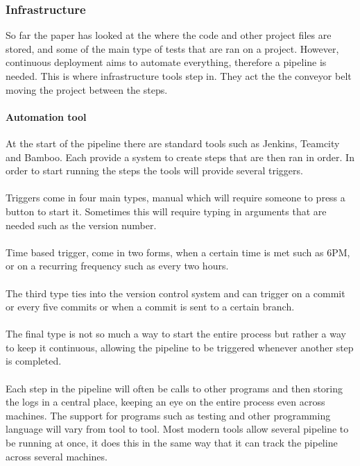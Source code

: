 \subsubsection{Infrastructure}

So far the paper has looked at the where the code and other project files are stored, and some of the main type of tests that are ran on a project. However, continuous deployment aims to automate everything, therefore a pipeline is needed. This is where infrastructure tools step in. They act the the conveyor belt moving the project between the steps.

\paragraph{Automation tool}
At the start of the pipeline there are standard tools such as Jenkins, Teamcity and Bamboo. Each provide a system to create steps that are then ran in order. In order to start running the steps the tools will provide several triggers.
\\\\
Triggers come in four main types, manual which will require someone to press a button to start it. Sometimes this will require typing in arguments that are needed such as the version number. 
\\\\
Time based trigger, come in two forms, when a certain time is met such as 6PM, or on a recurring frequency such as every two hours.
\\\\
The third type ties into the version control system and can trigger on a commit or every five commits or when a commit is sent to a certain branch. 
\\\\
The final type is not so much a way to start the entire process but rather a way to keep it continuous, allowing the pipeline to be triggered whenever another step is completed.
\\\\
Each step in the pipeline will often be calls to other programs and then storing the logs in a central place, keeping an eye on the entire process even across machines. The support for programs such as testing and other programming language will vary from tool to tool. Most modern tools allow several pipeline to be running at once, it does this in the same way that it can track the pipeline across several machines. 
\\\\
